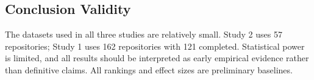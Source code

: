 \subsection{Conclusion Validity}

The datasets used in all three studies are relatively small. Study 2 uses 57 repositories; Study 1 uses 162 repositories with 121 completed. Statistical power is limited, and all results should be interpreted as early empirical evidence rather than definitive claims. All rankings and effect sizes are preliminary baselines.
